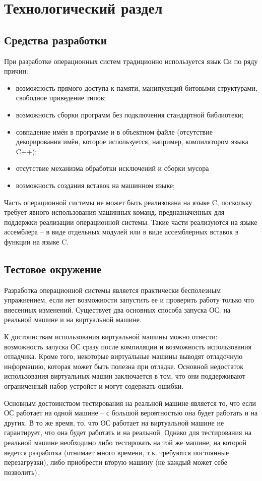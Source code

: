\chapter{Технологический раздел}
\label{cha:impl}

\section{Средства разработки}
При разработке операционных систем традиционно используется язык Си по ряду причин:
\begin{itemize}
\item возможность прямого доступа к памяти, манипуляций битовыми
структурами, свободное приведение типов;
\item возможность сборки программ без подключения стандартной
библиотеки;
\item совпадение имён в программе и в объектном файле (отсутствие декорирования имён,
	которое используется, например, компилятором языка C++);
\item отсутствие механизма обработки исключений и сборки мусора
\item возможность создания вставок на машинном языке;
\end{itemize}

Часть операционной системы не может быть реализована на языке C, поскольку
требует явного использования машинных команд, предназначенных для поддержки
реализации операционной системы. Такие части реализуются на языке ассемблера
-- в виде отдельных модулей или в виде ассемблерных вставок в функции на
языке C.

\section{Тестовое окружение}
Разработка операционной системы является практически бесполезным упражнением,
если нет возможности запустить ее и проверить работу только что внесенных
изменений. Существует два основных способа запуска ОС: на реальной машине
и на виртуальной машине.

К достоинствам использования виртуальной машины можно отнести: возможность
запуска ОС сразу после компиляции и возможность использования отладчика. Кроме
того, некоторые виртуальные машины выводят отладочную информацию, которая
может быть полезна при отладке. Основной недостаток использования виртуальных
машин заключается в том, что они поддерживают ограниченный набор устройст и
могут содержать ошибки.

Основным достоинством тестирования на реальной машине является то, что если
ОС работает на одной машине -- с большой вероятностью она будет работать и
на других. В то же время, то, что ОС работает на виртуальной машине не
гарантирует, что она будет работать и на реальной. Однако для тестирования
на реальной машине необходимо либо тестировать на той же машине, на которой
ведется разработка (отнимает много времени, т.к. требуются постоянные
перезагрузки), либо приобрести вторую машину (не каждый может себе позволить).

